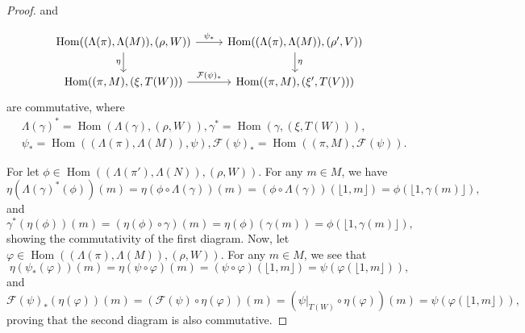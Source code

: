 \documentclass[10pt,a4paper]{amsart}
\newcommand{\F}{\mathcal{F}}
\newcommand{\Hom}{\operatorname{Hom}}
\begin{document}
\begin{proof}
    
    and 
    
   \[
        \begin{tikzcd}
           \Hom((\Lambda (\pi), \Lambda(M)), (\rho, W)) 
            \arrow[r, "\psi_*"] 
            \arrow[d, "\eta"'] 
            & \Hom((\Lambda (\pi), \Lambda(M)), (\rho', V)) 
            \arrow[d, "\eta"] \\
            \Hom((\pi , M), (\xi, T(W))) 
            \arrow[r, "\F(\psi)_*"] 
            & \Hom((\pi , M), (\xi', T(V)))
        \end{tikzcd}
    \]  
     are commutative, where 
     \begin{align*}
     &\Lambda(\gamma)^* = \Hom (\Lambda (\gamma ), (\rho , W)), 
     {\gamma} ^*= \Hom (\gamma , (\xi , T(W))),\\
     &\psi _* = \Hom ((\Lambda(\pi), \Lambda (M)), \psi), \F(\psi)_* = \Hom ((\pi,M), \F (\psi) ) .
    \end{align*} 
    

   For let \(\phi \in \Hom((\Lambda({\pi}'), \Lambda(N)), (\rho, W))\). For any \(m \in M\), we have
    \[
        \eta(\Lambda(\gamma)^*(\phi))(m) = \eta(\phi \circ \Lambda(\gamma))(m) = (\phi \circ \Lambda(\gamma))(\lfloor 1, m \rfloor) = \phi(\lfloor 1, \gamma(m) \rfloor),
    \]
    and
    \[
        \gamma^*(\eta(\phi))(m) = (\eta(\phi) \circ \gamma)(m) = \eta(\phi)(\gamma(m)) = \phi(\lfloor 1, \gamma(m) \rfloor),
    \]
     showing  the commutativity of the  first diagram. Now, let \(\varphi \in \Hom((\Lambda(\pi), \Lambda(M)), (\rho, W))\). For any \(m \in M\), we see that
    \[
        \eta(\psi_*(\varphi))(m) = \eta(\psi \circ \varphi)(m) = (\psi \circ \varphi)(\lfloor 1, m \rfloor) = \psi(\varphi(\lfloor 1, m \rfloor)),
    \]
    and
    \[
        \F(\psi)_*(\eta(\varphi))(m) = (\F(\psi) \circ \eta(\varphi))(m) = (\psi|_{T(W)} \circ \eta(\varphi))(m) = \psi(\varphi(\lfloor 1, m \rfloor)),
    \]
    proving that the second diagram is also commutative.
\end{proof}
\end{document}
